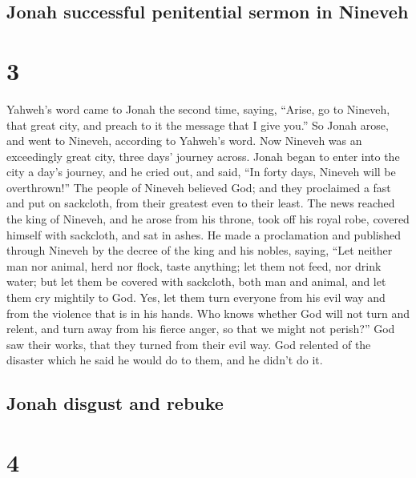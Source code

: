 \hypertarget{jonah-successful-penitential-sermon-in-nineveh}{%
\subsection{Jonah successful penitential sermon in
Nineveh}\label{jonah-successful-penitential-sermon-in-nineveh}}

\hypertarget{section-2}{%
\section{3}\label{section-2}}

 Yahweh's word came to Jonah the second time, saying,
 ``Arise, go to Nineveh, that great city, and preach to it
the message that I give you.''  So Jonah arose, and went
to Nineveh, according to Yahweh's word. Now Nineveh was an exceedingly
great city, three days' journey across.  Jonah began to
enter into the city a day's journey, and he cried out, and said, ``In
forty days, Nineveh will be overthrown!''  The people of
Nineveh believed God; and they proclaimed a fast and put on sackcloth,
from their greatest even to their least.  The news reached
the king of Nineveh, and he arose from his throne, took off his royal
robe, covered himself with sackcloth, and sat in ashes. 
He made a proclamation and published through Nineveh by the decree of
the king and his nobles, saying, ``Let neither man nor animal, herd nor
flock, taste anything; let them not feed, nor drink water;
 but let them be covered with sackcloth, both man and
animal, and let them cry mightily to God. Yes, let them turn everyone
from his evil way and from the violence that is in his hands.
 Who knows whether God will not turn and relent, and turn
away from his fierce anger, so that we might not perish?''
 God saw their works, that they turned from their evil
way. God relented of the disaster which he said he would do to them, and
he didn't do it.

\hypertarget{jonah-disgust-and-rebuke}{%
\subsection{Jonah disgust and rebuke}\label{jonah-disgust-and-rebuke}}

\hypertarget{section-3}{%
\section{4}\label{section-3}}

